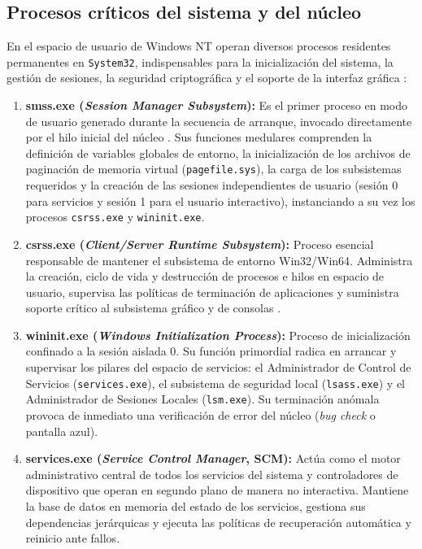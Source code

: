 \documentclass[12pt]{article}
\begin{document}
\subsection{Procesos críticos del sistema y del núcleo}\label{sec:procesosCriticosSystem32}

En el espacio de usuario de Windows NT operan diversos procesos residentes permanentes en \texttt{System32}, indispensables para la inicialización del sistema, la gestión de sesiones, la seguridad criptográfica y el soporte de la interfaz gráfica \parencite[\S 2.5, pp.\ 88--93]{stallings2018operating}:

\begin{enumerate}[leftmargin=*]
    \item \textbf{smss.exe (\textit{Session Manager Subsystem}):} Es el primer proceso en modo de usuario generado durante la secuencia de arranque, invocado directamente por el hilo inicial del núcleo \parencite[\S 22.3, p.\ 786]{silberschatz2006fundamentos}. Sus funciones medulares comprenden la definición de variables globales de entorno, la inicialización de los archivos de paginación de memoria virtual (\texttt{pagefile.sys}), la carga de los subsistemas requeridos y la creación de las sesiones independientes de usuario (sesión 0 para servicios y sesión 1 para el usuario interactivo), instanciando a su vez los procesos \texttt{csrss.exe} y \texttt{wininit.exe}.
    
    \item \textbf{csrss.exe (\textit{Client/Server Runtime Subsystem}):} Proceso esencial responsable de mantener el subsistema de entorno Win32/Win64. Administra la creación, ciclo de vida y destrucción de procesos e hilos en espacio de usuario, supervisa las políticas de terminación de aplicaciones y suministra soporte crítico al subsistema gráfico y de consolas \parencite[\S 21.3, p.\ 1042]{deitel2004operating}.
    
    \item \textbf{wininit.exe (\textit{Windows Initialization Process}):} Proceso de inicialización confinado a la sesión aislada 0. Su función primordial radica en arrancar y supervisar los pilares del espacio de servicios: el Administrador de Control de Servicios (\texttt{services.exe}), el subsistema de seguridad local (\texttt{lsass.exe}) y el Administrador de Sesiones Locales (\texttt{lsm.exe}). Su terminación anómala provoca de inmediato una verificación de error del núcleo (\textit{bug check} o pantalla azul).
    
    \item \textbf{services.exe (\textit{Service Control Manager}, SCM):} Actúa como el motor administrativo central de todos los servicios del sistema y controladores de dispositivo que operan en segundo plano de manera no interactiva. Mantiene la base de datos en memoria del estado de los servicios, gestiona sus dependencias jerárquicas y ejecuta las políticas de recuperación automática y reinicio ante fallos.
    

\end{enumerate}
\end{document}
